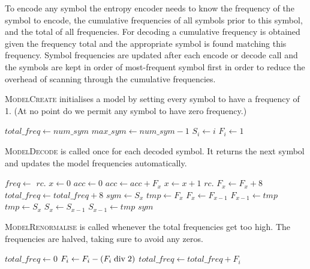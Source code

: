 \documentclass[a4paper]{article}
\begin{document}
To encode any symbol the entropy encoder needs to know the frequency of the symbol to encode, the cumulative frequencies of all symbols prior to this symbol, and the total of all frequencies.
For decoding a cumulative frequency is obtained given the frequency total and the appropriate symbol is found matching this frequency.
Symbol frequencies are updated after each encode or decode call and the symbols are kept in order of most-frequent symbol first in order to  reduce the overhead of scanning through the cumulative frequencies.

\textsc{ModelCreate} initialises a model by setting every symbol to have a frequency of 1.
(At no point do we permit any symbol to have zero frequency.)

\begin{algorithmic}[1]
  \State $total\_freq \gets num\_sym$
  \State $max\_sym \gets num\_sym-1$
    \State $S_i \gets i$
    \State $F_i \gets 1$
  \EndFor
\EndProcedure
\end{algorithmic}

\textsc{ModelDecode} is called once for each decoded symbol.
It returns the next symbol and updates the model frequencies automatically.

\begin{algorithmic}[1]
  \State $freq \gets$ $rc.$
  \State $x \gets 0$
  \State $acc \gets 0$
    \State $acc \gets acc + F_x$
    \State $x \gets x+1$
  \EndWhile
  \State $rc.$
  \State $F_x \gets F_x + 8$ 
  \State $total\_freq \gets total\_freq + 8$
    \State {}
  \EndIf
  \State $sym \gets S_x$
    \State $tmp \gets F_x$ 
    \State $F_x \gets F_{x-1}$
    \State $F_{x-1} \gets tmp$
    \State $tmp \gets S_x$ 
    \State $S_x \gets S_{x-1}$
    \State $S_{x-1} \gets tmp$
  \EndIf
  \State \Return $sym$
\EndFunction
\end{algorithmic}

\textsc{ModelRenormalise} is called whenever the total frequencies get too high.
The frequencies are halved, taking sure to avoid any zeros.

\begin{algorithmic}[1]
  \State $total\_freq \gets 0$
    \State $F_i \gets F_i - (F_i \bdiv 2)$
    \State $total\_freq \gets total\_freq + F_i$
  \EndFor
\EndProcedure
\end{algorithmic}
\end{document}
